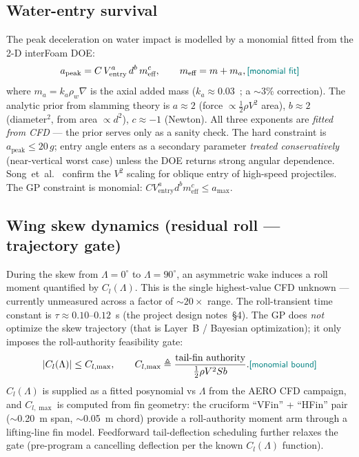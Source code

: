 \documentclass{new-aiaa}
\newcommand{\gpc}[1]{\textcolor{teal}{\small\textsf{[#1]}}} %
\begin{document}
\subsection{Water-entry survival}\label{sec:entry}
The peak deceleration on water impact is modelled by a monomial fitted from the 2-D interFoam DOE:
\begin{equation}
a_{\text{peak}} = C\, V_{\text{entry}}^a\, d^b\, m_{\text{eff}}^c,
\qquad m_{\text{eff}} = m + m_a, \gpc{monomial fit}
\end{equation}
where $m_a=k_a\rho_w\nabla$ is the axial added mass
($k_a\approx0.03$~\cite{newman2018marine}; a $\sim$3\% correction). The analytic prior from
slamming theory is $a\approx2$ (force $\propto\frac12\rho V^2$ area), $b\approx2$ (diameter$^2$, from area $\propto d^2$),
$c\approx-1$ (Newton). All three exponents are \emph{fitted from CFD} — the prior serves only as a
sanity check. The hard constraint is $a_{\text{peak}}\le 20\,g$; entry angle enters as a secondary
parameter \emph{treated conservatively} (near-vertical worst case) unless the DOE returns strong
angular dependence. Song~et~al.~\cite{song2020waterentry} confirm the $V^2$ scaling for oblique
entry of high-speed projectiles. The GP constraint is monomial: $C V_{\text{entry}}^a d^b
m_{\text{eff}}^c \le a_{\max}$.

\subsection{Wing skew dynamics (residual roll — trajectory gate)}\label{sec:roll}
During the skew from $\Lambda=0^\circ$ to $\Lambda=90^\circ$, an asymmetric wake induces a roll
moment quantified by $C_l(\Lambda)$. This is the single highest-value CFD unknown — currently
unmeasured across a factor of $\sim20\times$ range. The roll-transient time constant is
$\tau\approx0.10$--$0.12$~s (the project design notes~\S4). The GP does \emph{not} optimize the skew trajectory
(that is Layer~B / Bayesian optimization); it only imposes the roll-authority feasibility gate:
\begin{equation}
|C_l(\Lambda)| \le C_{l,\max},
\qquad C_{l,\max} \triangleq \frac{\text{tail-fin authority}}{\tfrac12\rho V^2 S b}.
\gpc{monomial bound}
\end{equation}
$C_l(\Lambda)$ is supplied as a fitted posynomial vs $\Lambda$ from the AERO CFD campaign, and
$C_{l,\max}$ is computed from fin geometry: the cruciform ``VFin'' + ``HFin'' pair
($\sim$0.20~m span, $\sim$0.05~m chord) provide a roll-authority moment arm through a
lifting-line fin model. Feedforward tail-deflection scheduling further relaxes the gate (pre-program a
cancelling deflection per the known $C_l(\Lambda)$ function).
\end{document}
